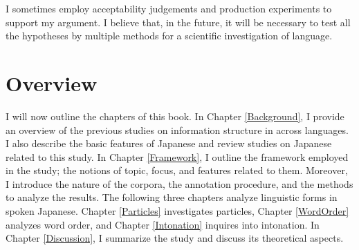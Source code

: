 I sometimes employ acceptability judgements and production experiments
to support my argument.
I believe that, in the future,
it will be necessary to test all the hypotheses by multiple methods
for a scientific investigation of language.


\section{Overview}\label{IntroOverview}

I will now outline the chapters of this book.
In Chapter \ref{Background},
I provide an overview of the previous studies on information structure in across languages.
I also describe the basic features of Japanese and review studies on Japanese related to this study.
In Chapter \ref{Framework},
I outline the framework employed in the study;
the notions of topic, focus, and features related to them.
Moreover, I introduce the nature of the corpora,
the annotation procedure, and the methods to analyze the results.
The following three chapters analyze linguistic forms in spoken Japanese.
Chapter \ref{Particles} investigates particles,
Chapter \ref{WordOrder} analyzes word order, and
Chapter \ref{Intonation} inquires into intonation.
In Chapter \ref{Discussion},
I summarize the study and discuss its theoretical aspects.

















